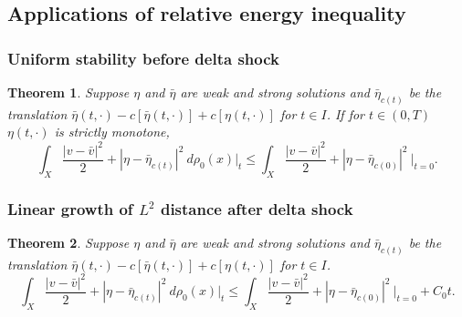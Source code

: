 \documentclass[10pt, letterpaper]{article}
\def\dr{{d\rho_0(x)}}
\newtheorem{theorem}{Theorem}
\theoremstyle{definition}
\theoremstyle{remark}
\begin{document}
\subsection{Applications of relative energy inequality}
\subsubsection{Uniform stability before delta shock}
\begin{theorem}
 Suppose $\eta$ and $\bar\eta$ are weak and strong solutions and $\bar\eta_{c(t)}$ be the translation $\bar\eta(t,\cdot) -c[\bar\eta(t,\cdot)] + c[\eta(t,\cdot)]$ for $t\in I$. If  for $t\in (0,T)$ $\eta(t,\cdot)$ is strictly monotone,
 $$\int_X \frac{|v-\bar v|^2}{2} + |\eta - \bar\eta_{c(t)}|^2 \:\dr\bigg|_{t} \le \int_X \frac{|v-\bar v|^2}{2} + |\eta - \bar\eta_{c(0)}|^2 \:\bigg|_{t=0}.$$
\end{theorem}
\subsubsection{Linear growth of $L^2$ distance after delta shock}
\begin{theorem}
 Suppose $\eta$ and $\bar\eta$ are weak and strong solutions and $\bar\eta_{c(t)}$ be the translation $\bar\eta(t,\cdot) -c[\bar\eta(t,\cdot)] + c[\eta(t,\cdot)]$ for $t\in I$. 
 $$\int_X \frac{|v-\bar v|^2}{2} + |\eta - \bar\eta_{c(t)}|^2 \:\dr\bigg|_{t} \le \int_X \frac{|v-\bar v|^2}{2} + |\eta - \bar\eta_{c(0)}|^2 \:\bigg|_{t=0} + C_0t.$$ 
\end{theorem}
\end{document}
